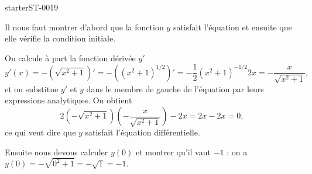 
\begin{corrige}{starterST-0019}


Il nous faut montrer d'abord que la fonction $y$ satisfait l'équation et ensuite que elle vérifie la condition initiale.  

On calcule à part la fonction dérivée $y'$
\[
y'(x) = - \left(\sqrt{x^2+1}\right)' = - \left((x^2+1)^{1/2}\right)' = -\frac{1}{2} (x^2+1)^{-1/2} 2 x = -\frac{x}{\sqrt{x^2+1}}, 
\]
 et on substitue $y'$ et $y$ dans le membre de gauche de l'équation par leurs expressions analytiques. On obtient
\[
2  \left(-\sqrt{x^2+1}\right) \left(-\frac{x}{\sqrt{x^2+1}}\right) -2x = 2x - 2x = 0, 
\]
ce qui veut dire que $y$ satisfait l'équation différentielle. 

Ensuite nous devons calculer $y(0)$ et montrer qu'il vaut $-1$ : on a $y(0) = -\sqrt{0^2 +1} = -\sqrt{1} = -1$. 
 


\end{corrige}
